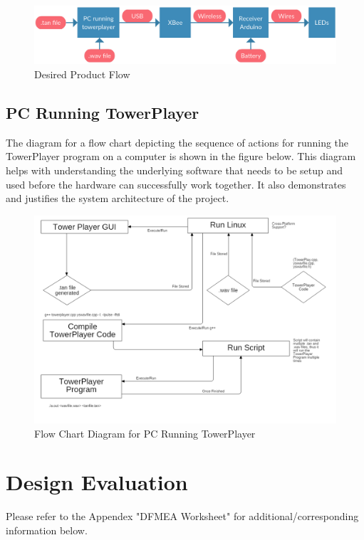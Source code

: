 \documentclass[12pt]{article}
\begin{document}
{{{{			\begin{figure}[ht!]
				\centering
				\includegraphics[width=170mm]{assets/What_We_Want.png}
				\caption{Desired Product Flow \label{overflow}}
			\end{figure}
		
		
		\subsection{PC Running TowerPlayer}
		The diagram for a flow chart depicting the sequence of actions for running the TowerPlayer program on a computer is shown in the figure below. This diagram helps with understanding the underlying software that needs to be setup and used before the hardware can successfully work together. It also demonstrates and justifies the system architecture of the project.
		
		\begin{figure}[ht!]
			\centering
			\includegraphics[width=150mm]{assets/PCRunningTowerPlayerFlowChartDiagram.png}
			\caption{Flow Chart Diagram for PC Running TowerPlayer \label{overflow}}
		\end{figure}
	
		\clearpage
		
		
	\section{Design Evaluation}
	Please refer to the Appendex "DFMEA Worksheet" for additional/corresponding information below.
	
}}}}
\end{document}

